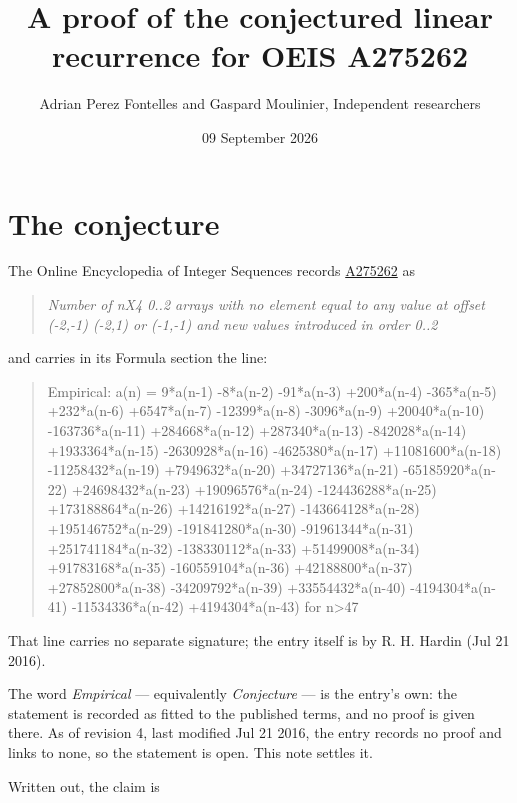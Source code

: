 \documentclass[11pt]{article}
\title{A proof of the conjectured linear recurrence for OEIS A275262}
\author{Adrian Perez Fontelles and Gaspard Moulinier, Independent researchers}
\date{09 September 2026}
\theoremstyle{definition}
\begin{document}
\maketitle
\section{The conjecture}

The Online Encyclopedia of Integer Sequences records \href{https://oeis.org/A275262}{A275262} as

\begin{quote}\itshape Number of nX4 0..2 arrays with no element equal to any value at offset (-2,-1) (-2,1) or (-1,-1) and new values introduced in order 0..2\end{quote}

and carries in its Formula section the line:

\begin{quote}\ttfamily Empirical: a(n) = 9*a(n-1) -8*a(n-2) -91*a(n-3) +200*a(n-4) -365*a(n-5) +232*a(n-6) +6547*a(n-7) -12399*a(n-8) -3096*a(n-9) +20040*a(n-10) -163736*a(n-11) +284668*a(n-12) +287340*a(n-13) -842028*a(n-14) +1933364*a(n-15) -2630928*a(n-16) -4625380*a(n-17) +11081600*a(n-18) -11258432*a(n-19) +7949632*a(n-20) +34727136*a(n-21) -65185920*a(n-22) +24698432*a(n-23) +19096576*a(n-24) -124436288*a(n-25) +173188864*a(n-26) +14216192*a(n-27) -143664128*a(n-28) +195146752*a(n-29) -191841280*a(n-30) -91961344*a(n-31) +251741184*a(n-32) -138330112*a(n-33) +51499008*a(n-34) +91783168*a(n-35) -160559104*a(n-36) +42188800*a(n-37) +27852800*a(n-38) -34209792*a(n-39) +33554432*a(n-40) -4194304*a(n-41) -11534336*a(n-42) +4194304*a(n-43) for n>47\end{quote}

That line carries no separate signature; the entry itself is by R. H. Hardin (Jul 21 2016).

The word {\itshape Empirical} --- equivalently {\itshape Conjecture} --- is the entry's own: the statement is recorded as fitted to the published terms, and no proof is given there. As of revision 4, last modified Jul 21 2016, the entry records no proof and links to none, so the statement is open. This note settles it.

Written out, the claim is
\end{document}
